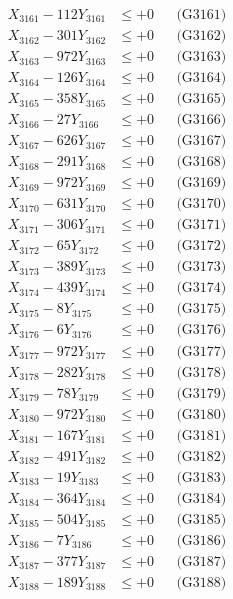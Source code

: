 \documentclass[a4paper,10pt]{article}
\begin{document}
{\begin{align}
\allowbreak
X_{3161} - 112Y_{3161} &\leq +0 && \text{(G3161)} \\
X_{3162} - 301Y_{3162} &\leq +0 && \text{(G3162)} \\
X_{3163} - 972Y_{3163} &\leq +0 && \text{(G3163)} \\
X_{3164} - 126Y_{3164} &\leq +0 && \text{(G3164)} \\
X_{3165} - 358Y_{3165} &\leq +0 && \text{(G3165)} \\
X_{3166} - 27Y_{3166} &\leq +0 && \text{(G3166)} \\
X_{3167} - 626Y_{3167} &\leq +0 && \text{(G3167)} \\
X_{3168} - 291Y_{3168} &\leq +0 && \text{(G3168)} \\
X_{3169} - 972Y_{3169} &\leq +0 && \text{(G3169)} \\
X_{3170} - 631Y_{3170} &\leq +0 && \text{(G3170)} \\
\allowbreak
X_{3171} - 306Y_{3171} &\leq +0 && \text{(G3171)} \\
X_{3172} - 65Y_{3172} &\leq +0 && \text{(G3172)} \\
X_{3173} - 389Y_{3173} &\leq +0 && \text{(G3173)} \\
X_{3174} - 439Y_{3174} &\leq +0 && \text{(G3174)} \\
X_{3175} - 8Y_{3175} &\leq +0 && \text{(G3175)} \\
X_{3176} - 6Y_{3176} &\leq +0 && \text{(G3176)} \\
X_{3177} - 972Y_{3177} &\leq +0 && \text{(G3177)} \\
X_{3178} - 282Y_{3178} &\leq +0 && \text{(G3178)} \\
X_{3179} - 78Y_{3179} &\leq +0 && \text{(G3179)} \\
X_{3180} - 972Y_{3180} &\leq +0 && \text{(G3180)} \\
\allowbreak
X_{3181} - 167Y_{3181} &\leq +0 && \text{(G3181)} \\
X_{3182} - 491Y_{3182} &\leq +0 && \text{(G3182)} \\
X_{3183} - 19Y_{3183} &\leq +0 && \text{(G3183)} \\
X_{3184} - 364Y_{3184} &\leq +0 && \text{(G3184)} \\
X_{3185} - 504Y_{3185} &\leq +0 && \text{(G3185)} \\
X_{3186} - 7Y_{3186} &\leq +0 && \text{(G3186)} \\
X_{3187} - 377Y_{3187} &\leq +0 && \text{(G3187)} \\
X_{3188} - 189Y_{3188} &\leq +0 && \text{(G3188)} \\

\end{align}}
\end{document}
